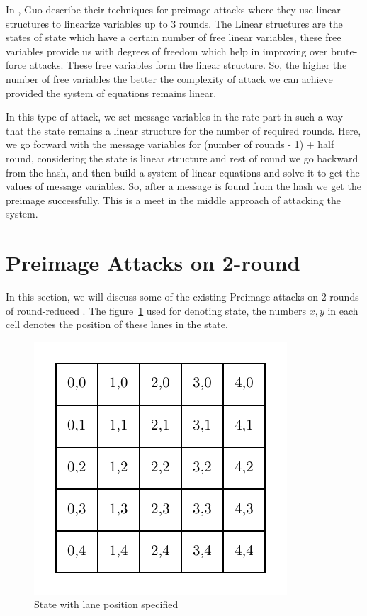 In \cite{guo2016linear}, Guo \etal describe their techniques for preimage attacks where they use linear structures to linearize variables up to 3 rounds. The Linear structures are the states of \KECCAK{} state which have a certain number of free linear variables, these free variables provide us with degrees of freedom which help in improving over brute-force attacks. These free variables form the linear structure. So, the higher the number of free variables the better the complexity of attack we can achieve provided the system of equations remains linear.

In this type of attack, we set message variables in the rate part in such a way that the state remains a linear structure for the number of required rounds. Here, we go forward with the message variables for (number of rounds - 1) + half round, considering the state is linear structure and rest of round we go backward from the hash, and then build a system of linear equations and solve it to get the values of message variables. So, after a message is found from the hash we get the preimage successfully. This is a meet in the middle approach of attacking the system.

\section{Preimage Attacks on 2-round \KECCAK}

In this section, we will discuss some of the existing Preimage attacks on 2 rounds of round-reduced \KECCAK{}. The figure~\ref{fig:linkeccakstate} used for denoting \KECCAK{} state, the numbers $x,y$ in each cell denotes the position of these lanes in the state.

\begin{figure}
    \centering
    \includegraphics{keccakState.pdf}
    \caption{\KECCAK{} State with lane position specified}
    \label{fig:linkeccakstate}
\end{figure}


